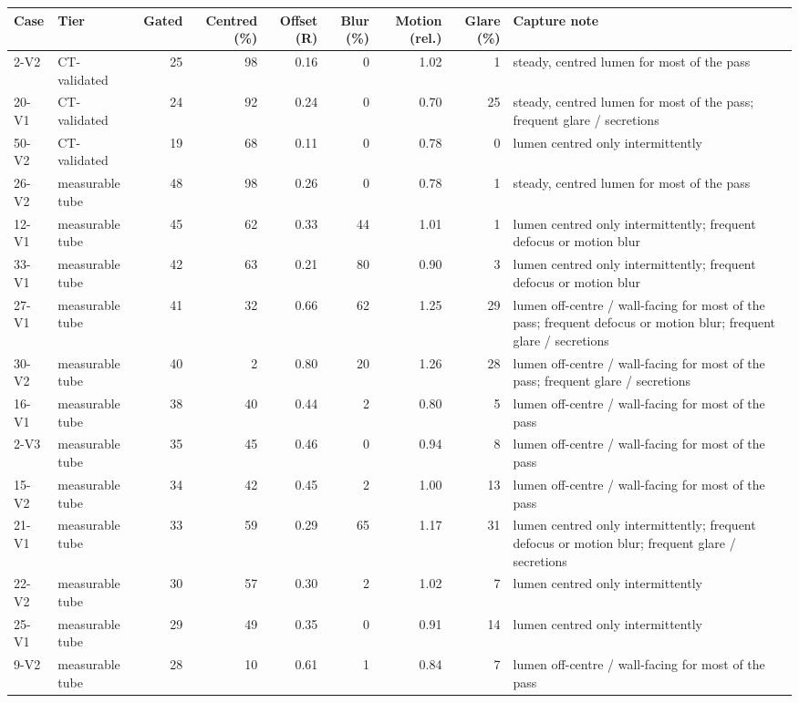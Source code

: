 \begin{tabular}{llrrrrrrl}
\toprule
Case & Tier & Gated & Centred (\%) & Offset (R) & Blur (\%) & Motion (rel.) & Glare (\%) & Capture note \\
\midrule
2-V2 & CT-validated & 25 & 98 & 0.16 & 0 & 1.02 & 1 & steady, centred lumen for most of the pass \\
20-V1 & CT-validated & 24 & 92 & 0.24 & 0 & 0.70 & 25 & steady, centred lumen for most of the pass; frequent glare / secretions \\
50-V2 & CT-validated & 19 & 68 & 0.11 & 0 & 0.78 & 0 & lumen centred only intermittently \\
26-V2 & measurable tube & 48 & 98 & 0.26 & 0 & 0.78 & 1 & steady, centred lumen for most of the pass \\
12-V1 & measurable tube & 45 & 62 & 0.33 & 44 & 1.01 & 1 & lumen centred only intermittently; frequent defocus or motion blur \\
33-V1 & measurable tube & 42 & 63 & 0.21 & 80 & 0.90 & 3 & lumen centred only intermittently; frequent defocus or motion blur \\
27-V1 & measurable tube & 41 & 32 & 0.66 & 62 & 1.25 & 29 & lumen off-centre / wall-facing for most of the pass; frequent defocus or motion blur; frequent glare / secretions \\
30-V2 & measurable tube & 40 & 2 & 0.80 & 20 & 1.26 & 28 & lumen off-centre / wall-facing for most of the pass; frequent glare / secretions \\
16-V1 & measurable tube & 38 & 40 & 0.44 & 2 & 0.80 & 5 & lumen off-centre / wall-facing for most of the pass \\
2-V3 & measurable tube & 35 & 45 & 0.46 & 0 & 0.94 & 8 & lumen off-centre / wall-facing for most of the pass \\
15-V2 & measurable tube & 34 & 42 & 0.45 & 2 & 1.00 & 13 & lumen off-centre / wall-facing for most of the pass \\
21-V1 & measurable tube & 33 & 59 & 0.29 & 65 & 1.17 & 31 & lumen centred only intermittently; frequent defocus or motion blur; frequent glare / secretions \\
22-V2 & measurable tube & 30 & 57 & 0.30 & 2 & 1.02 & 7 & lumen centred only intermittently \\
25-V1 & measurable tube & 29 & 49 & 0.35 & 0 & 0.91 & 14 & lumen centred only intermittently \\
9-V2 & measurable tube & 28 & 10 & 0.61 & 1 & 0.84 & 7 & lumen off-centre / wall-facing for most of the pass \\

\end{tabular}
